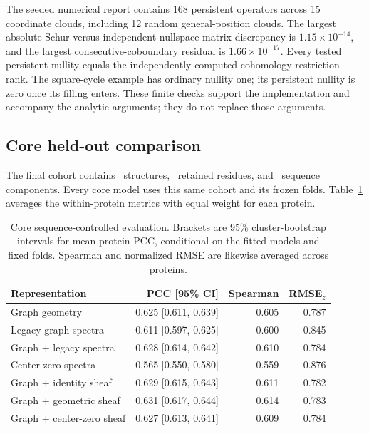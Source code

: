 The seeded numerical report contains 168 persistent operators across 15 coordinate clouds, including 12 random general-position clouds. The largest absolute Schur-versus-independent-nullspace matrix discrepancy is $1.15\times10^{-14}$, and the largest consecutive-coboundary residual is $1.66\times10^{-17}$. Every tested persistent nullity equals the independently computed cohomology-restriction rank. The square-cycle example has ordinary nullity one; its persistent nullity is zero once its filling enters. These finite checks support the implementation and accompany the analytic arguments; they do not replace those arguments.

\subsection{Core held-out comparison}
The final cohort contains \StudyProteins\ structures, \StudyResidues\ retained residues, and \StudyClusters\ sequence components. Every core model uses this same cohort and its frozen folds. Table~\ref{tab:core} averages the within-protein metrics with equal weight for each protein.


\begin{table}[htbp]\centering\small
\caption{Core sequence-controlled evaluation. Brackets are 95\% cluster-bootstrap intervals for mean protein PCC, conditional on the fitted models and fixed folds. Spearman and normalized RMSE are likewise averaged across proteins.}
\label{tab:core}
\begin{tabular}{lrrr}\toprule
Representation & PCC [95\% CI] & Spearman & RMSE$_z$\\\midrule
Graph geometry & 0.625 [0.611, 0.639] & 0.605 & 0.787 \\
Legacy graph spectra & 0.611 [0.597, 0.625] & 0.600 & 0.845 \\
Graph + legacy spectra & 0.628 [0.614, 0.642] & 0.610 & 0.784 \\
Center-zero spectra & 0.565 [0.550, 0.580] & 0.559 & 0.876 \\
Graph + identity sheaf & 0.629 [0.615, 0.643] & 0.611 & 0.782 \\
Graph + geometric sheaf & 0.631 [0.617, 0.644] & 0.614 & 0.783 \\
Graph + center-zero sheaf & 0.627 [0.613, 0.641] & 0.609 & 0.784 \\
\bottomrule\end{tabular}\end{table}



